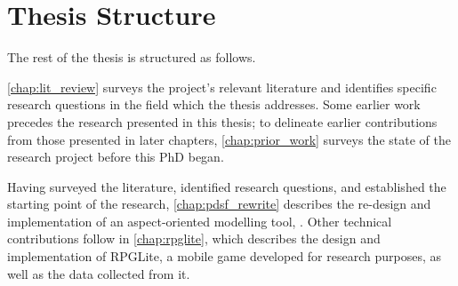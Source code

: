 






\section{Thesis Structure}

The rest of the thesis is structured as follows.

\cref{chap:lit_review} surveys the project's relevant literature and identifies
specific research questions in the field which the thesis addresses. Some
earlier work precedes the research presented in this thesis; to delineate
earlier contributions from those presented in later chapters,
\cref{chap:prior_work} surveys the state of the research project before this PhD
began.

Having surveyed the literature, identified research questions, and established
the starting point of the research, \cref{chap:pdsf_rewrite} describes the
re-design and implementation of an aspect-oriented modelling tool,
\pdsf{}. Other technical contributions follow in
\cref{chap:rpglite}, which describes the design and implementation of RPGLite, a
mobile game developed for research purposes, as well as the data collected from
it.

